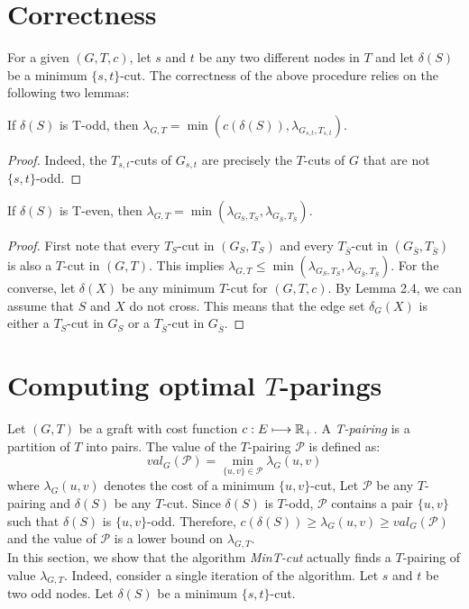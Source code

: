 \section{Correctness}
For a given $(G,T,c)$, let $s$ and $t$ be any two different nodes in $T$ and let $\delta(S)$ be a minimum $\{s,t\}$-cut. The correctness of the above procedure relies on the following two lemmas:
\begin{lemma}
If $\delta(S)$ is T-odd, then $\lambda_{G,T} = \min(c(\delta(S)), \lambda_{G_{s,t}, T_{s,t}})$.
\end{lemma}

\begin{proof}
Indeed, the $T_{s,t}$-cuts of $G_{s,t}$ are precisely the $T$-cuts of $G$ that are not $\{s,t\}$-odd.
\end{proof}

\begin{lemma}
If $\delta(S)$ is T-even, then $\lambda_{G,T} = \min( \lambda_{G_{S}, T_{S}}, \lambda_{G_{\bar{S}}, T_{\bar{S}}})$.
\end{lemma}

\begin{proof}
First note that every $T_S$-cut in $(G_S, T_S)$ and every $T_{\bar{S}}$-cut in $(G_{\bar{S}},T_{\bar{S}})$ is also a $T$-cut in $(G,T)$. This implies $\lambda_{G,T} \le \min( \lambda_{G_{S}, T_{S}}, \lambda_{G_{\bar{S}}, T_{\bar{S}}})$. 
For the converse, let $\delta(X)$ be any minimum $T$-cut for $(G,T,c)$. By Lemma 2.4, we can assume that $S$ and $X$ do not cross. This means that the edge set $\delta_{G}(X)$ is either a $T_S$-cut in $G_S$ or a $T_{\bar{S}}$-cut in $G_{\bar{S}}$.
\end{proof}

\section{Computing optimal $T$-parings}
Let $(G,T)$ be a graft with cost function $c: E \longmapsto \mathbb{R}_+$. A \emph{T-pairing} is a partition of $T$ into pairs. The value of the $T$-pairing $\mathcal{P}$ is defined as: 
\[
val_G (\mathcal{P}) = \min_{\{u,v\} \in \mathcal{P}} \lambda_{G}(u,v) 
\]
where $\lambda_G (u,v)$ denotes the cost of a minimum $\{u,v\}$-cut, Let $\mathcal{P}$ be any $T$-pairing and $\delta(S)$ be any $T$-cut. Since $\delta(S)$ is $T$-odd, $\mathcal{P}$ contains a pair $\{u,v\}$ such that $\delta(S)$ is $\{u,v\}$-odd. Therefore, $c(\delta(S)) \ge \lambda_G (u,v) \ge val_G (\mathcal{P})$ and the value of $\mathcal{P}$ is a lower bound on $\lambda_{G,T}$.\\
In this section, we show that the algorithm \emph{MinT-cut} actually finds a $T$-pairing of value $\lambda_{G,T}$. Indeed, consider a single iteration of the algorithm. Let $s$ and $t$ be two odd nodes. Let $\delta(S)$ be a minimum $\{s,t\}$-cut. 

